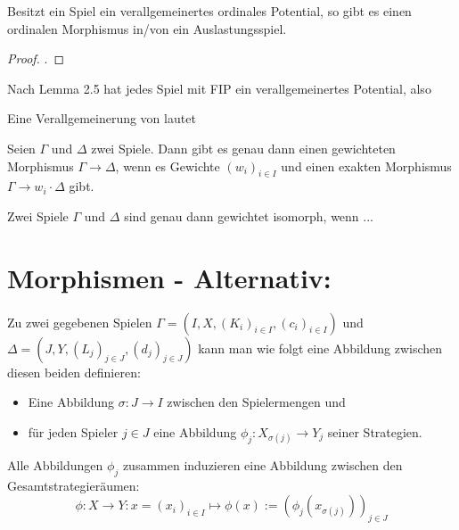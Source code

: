 \begin{beob}
	Besitzt ein Spiel ein verallgemeinertes ordinales Potential, so gibt es einen ordinalen Morphismus in/von  ein Auslastungsspiel.
\end{beob}

\begin{proof}
	.
\end{proof}

\begin{beob}
	Nach \cite{MonShap} Lemma 2.5 hat jedes Spiel mit FIP ein verallgemeinertes Potential, also 
\end{beob}


Eine Verallgemeinerung von  lautet

\begin{prop}
	Seien $\Gamma$ und $\Delta$ zwei Spiele. Dann gibt es genau dann einen gewichteten Morphismus $\Gamma \to \Delta$, wenn es Gewichte $(w_i)_{i\in I}$ und einen exakten Morphismus $\Gamma \to w_i \cdot \Delta$ gibt.
\end{prop}

\begin{kor}
	Zwei Spiele $\Gamma$ und $\Delta$ sind genau dann gewichtet isomorph, wenn ... 
\end{kor}


\section{Morphismen - Alternativ:}

Zu zwei gegebenen Spielen $\Gamma = (I, X, (K_i)_{i\in I}, (c_i)_{i\in I})$ und $\Delta = (J, Y, (L_j)_{j\in J}, (d_j)_{j\in J})$ kann man wie folgt eine Abbildung zwischen diesen beiden definieren:
\begin{itemize}
	\item Eine Abbildung $\sigma: J \to I$ zwischen den Spielermengen und
	\item für jeden Spieler $j \in J$ eine Abbildung $\phi_j: X_{\sigma(j)} \to Y_j$ seiner Strategien.
\end{itemize}

\begin{bem}
	Alle Abbildungen $\phi_j$ zusammen induzieren eine Abbildung zwischen den Gesamtstrategieräumen:
		\[\phi: X \to Y: x=(x_i)_{i\in I} \mapsto \phi(x) := \left(\phi_j(x_{\sigma(j)})\right)_{j \in J} \]
\end{bem}

